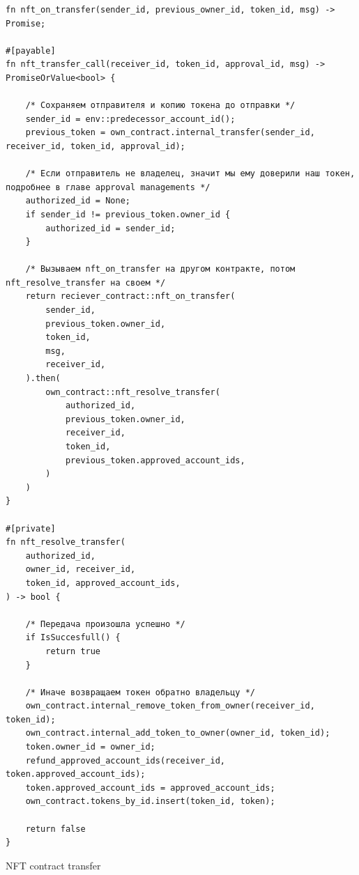 \begin{listing}
\begin{verbatim}
fn nft_on_transfer(sender_id, previous_owner_id, token_id, msg) -> Promise;

#[payable]
fn nft_transfer_call(receiver_id, token_id, approval_id, msg) -> PromiseOrValue<bool> {

    /* Сохраняем отправителя и копию токена до отправки */
    sender_id = env::predecessor_account_id();
    previous_token = own_contract.internal_transfer(sender_id, receiver_id, token_id, approval_id);

    /* Если отправитель не владелец, значит мы ему доверили наш токен, подробнее в главе approval managements */
    authorized_id = None;
    if sender_id != previous_token.owner_id {
        authorized_id = sender_id;
    }

    /* Вызываем nft_on_transfer на другом контракте, потом nft_resolve_transfer на своем */
    return reciever_contract::nft_on_transfer(
        sender_id,
        previous_token.owner_id,
        token_id,
        msg,
        receiver_id,
    ).then(
        own_contract::nft_resolve_transfer(
            authorized_id,
            previous_token.owner_id,
            receiver_id,
            token_id,
            previous_token.approved_account_ids,
        )
    )
}

#[private]
fn nft_resolve_transfer(
    authorized_id,
    owner_id, receiver_id,
    token_id, approved_account_ids,
) -> bool {

    /* Передача произошла успешно */
    if IsSuccesfull() {
        return true
    }

    /* Иначе возвращаем токен обратно владельцу */
    own_contract.internal_remove_token_from_owner(receiver_id, token_id);
    own_contract.internal_add_token_to_owner(owner_id, token_id);
    token.owner_id = owner_id;
    refund_approved_account_ids(receiver_id, token.approved_account_ids);
    token.approved_account_ids = approved_account_ids;
    own_contract.tokens_by_id.insert(token_id, token);

    return false
}
\end{verbatim}
\caption{NFT contract transfer}
\label{nftcontract.transfer1}
\end{listing}

